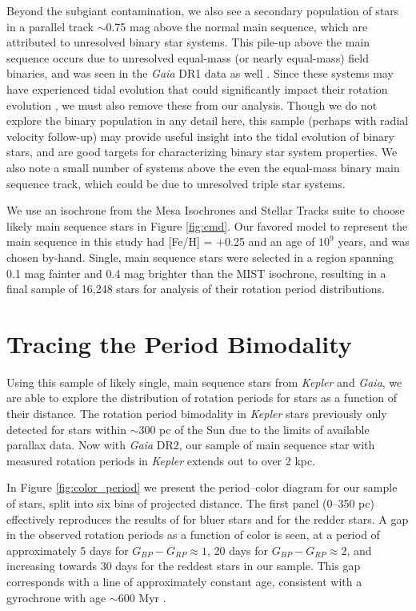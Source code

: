\documentclass[preprint2]{aastex62}
\newcommand{\Kepler}{\textsl{Kepler}\xspace}
\begin{document}
Beyond the subgiant contamination, we also see a secondary population of stars in a parallel track $\sim$0.75 mag above the normal main sequence, which are attributed to unresolved binary star systems. This pile-up above the main sequence occurs due to unresolved equal-mass (or nearly equal-mass) field binaries, and was seen in the {\em Gaia} DR1 data as well \citep{anderson2017}. Since these systems may have experienced tidal evolution that could significantly impact their rotation evolution \citep[e.g.][]{lurie2017}, we must also remove these from our analysis. Though we do not explore the binary population in any detail here, this sample (perhaps with radial velocity follow-up) may provide useful insight into the tidal evolution of binary stars, and are good targets for characterizing binary star system properties. We also note a small number of systems above the even the equal-mass binary main sequence track, which could be due to unresolved triple star systems.

We use an isochrone from the Mesa Isochrones and Stellar Tracks suite \citep[MIST;][]{MIST} to choose likely main sequence stars in Figure \ref{fig:cmd}. Our favored model to represent the main sequence in this study had [Fe/H] = +0.25 and an age of $10^9$ years, and was chosen by-hand. Single, main sequence stars were selected in a region spanning 0.1 mag fainter and 0.4 mag brighter than the MIST isochrone, resulting in a final sample  of 16,248 stars for analysis of their rotation period distributions.







\section{Tracing the Period Bimodality}
Using this sample of likely single, main sequence stars from \Kepler and {\em Gaia}, we are able to explore the distribution of rotation periods for stars as a function of their distance. The rotation period bimodality in \Kepler stars previously only detected for stars within $\sim$300 pc of the Sun due to the limits of available parallax data. Now with {\em Gaia} DR2, our sample of main sequence star with measured rotation periods in \Kepler extends out to over 2 kpc.

In Figure \ref{fig:color_period} we present the period--color diagram for our sample of stars, split into six bins of projected distance. The first panel (0--350 pc) effectively reproduces the results of \citet{davenport2017} for bluer stars and \citet{mcquillan2014} for the redder stars. A gap in the observed rotation periods as a function of color is seen, at a period of approximately 5 days for $G_{BP}-G_{RP}\approx1$, 20 days for $G_{BP}-G_{RP}\approx2$, and increasing towards 30 days for the reddest stars in our sample. This gap corresponds with a line of approximately constant age, consistent with a gyrochrone with age $\sim$600 Myr \citep{davenport2017}. 
\end{document}
